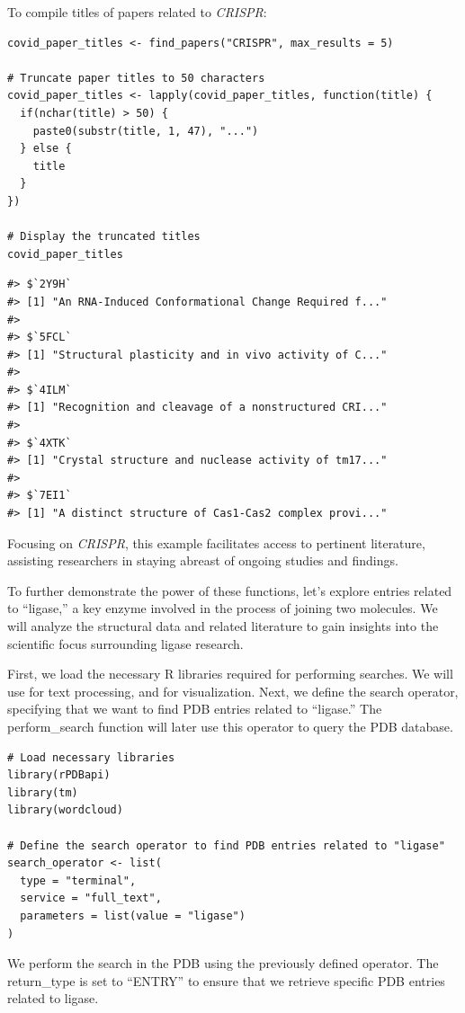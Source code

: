 To compile titles of papers related to \emph{CRISPR}:

\begin{verbatim}
covid_paper_titles <- find_papers("CRISPR", max_results = 5)

# Truncate paper titles to 50 characters
covid_paper_titles <- lapply(covid_paper_titles, function(title) {
  if(nchar(title) > 50) {
    paste0(substr(title, 1, 47), "...")
  } else {
    title
  }
})

# Display the truncated titles
covid_paper_titles
\end{verbatim}

\begin{verbatim}
#> $`2Y9H`
#> [1] "An RNA-Induced Conformational Change Required f..."
#> 
#> $`5FCL`
#> [1] "Structural plasticity and in vivo activity of C..."
#> 
#> $`4ILM`
#> [1] "Recognition and cleavage of a nonstructured CRI..."
#> 
#> $`4XTK`
#> [1] "Crystal structure and nuclease activity of tm17..."
#> 
#> $`7EI1`
#> [1] "A distinct structure of Cas1-Cas2 complex provi..."
\end{verbatim}

Focusing on \emph{CRISPR}, this example facilitates access to pertinent literature, assisting researchers in staying abreast of ongoing studies and findings.

To further demonstrate the power of these functions, let's explore entries related to ``ligase,'' a key enzyme involved in the process of joining two molecules. We will analyze the structural data and related literature to gain insights into the scientific focus surrounding ligase research.

First, we load the necessary R libraries required for performing searches. We will use  for text processing, and  for visualization. Next, we define the search operator, specifying that we want to find PDB entries related to ``ligase.'' The perform\_search function will later use this operator to query the PDB database.

\begin{verbatim}
# Load necessary libraries
library(rPDBapi)  
library(tm)       
library(wordcloud) 

# Define the search operator to find PDB entries related to "ligase"
search_operator <- list(
  type = "terminal",
  service = "full_text",
  parameters = list(value = "ligase")
)
\end{verbatim}

We perform the search in the PDB using the previously defined operator. The return\_type is set to ``ENTRY'' to ensure that we retrieve specific PDB entries related to ligase.

